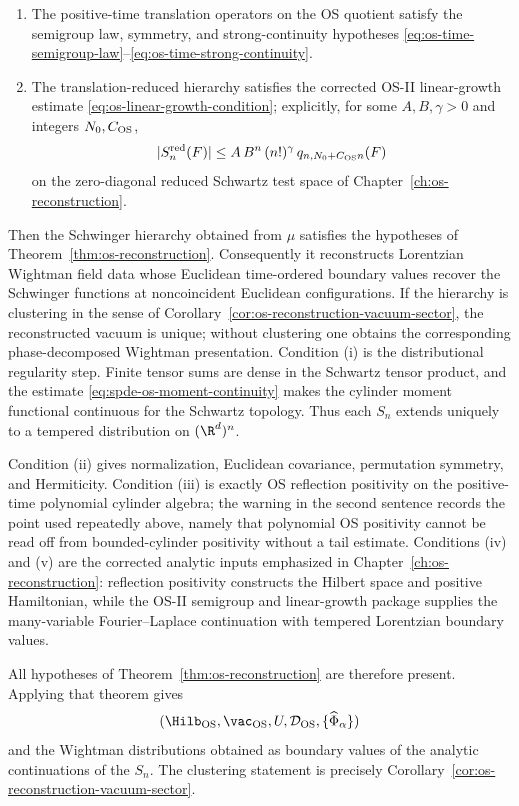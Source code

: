 \begin{remark}
\begin{enumerate}[label=(\roman*)]
  integrability or truncation estimates appropriate to the cutoff limit.
  \item The positive-time translation operators on the OS quotient satisfy
  the semigroup law, symmetry, and strong-continuity hypotheses
  \eqref{eq:os-time-semigroup-law}--\eqref{eq:os-time-strong-continuity}.
  \item The translation-reduced hierarchy satisfies the corrected OS-II
  linear-growth estimate \eqref{eq:os-linear-growth-condition};
  explicitly, for some \(A,B,\gamma>0\) and integers \(N_0,C_{\rm OS}\),
  \[
    |S_n^{\rm red}(F)|
    \leq
    A\,B^n\,(n!)^\gamma\,
    q_{n,N_0+C_{\rm OS}n}(F)
  \]
  on the zero-diagonal reduced Schwartz test space of
  Chapter~\ref{ch:os-reconstruction}.
\end{enumerate}
Then the Schwinger hierarchy obtained from \(\mu\) satisfies the hypotheses
of Theorem~\ref{thm:os-reconstruction}.  Consequently it reconstructs
Lorentzian Wightman field data whose Euclidean time-ordered boundary values
recover the Schwinger functions at noncoincident Euclidean configurations.
If the hierarchy is clustering in the sense of
Corollary~\ref{cor:os-reconstruction-vacuum-sector}, the reconstructed vacuum is
unique; without clustering one obtains the corresponding phase-decomposed
Wightman presentation.
Condition (i) is the distributional regularity step.  Finite tensor sums are
dense in the Schwartz tensor product, and the estimate
\eqref{eq:spde-os-moment-continuity} makes the cylinder moment functional
continuous for the Schwartz topology.  Thus each \(S_n\) extends uniquely to
a tempered distribution on \((\R^d)^n\).

Condition (ii) gives normalization, Euclidean covariance, permutation
symmetry, and Hermiticity.  Condition (iii) is exactly OS reflection
positivity on the positive-time polynomial cylinder algebra; the warning in
the second sentence records the point used repeatedly above, namely that
polynomial OS positivity cannot be read off from bounded-cylinder positivity
without a tail estimate.  Conditions (iv) and (v) are the corrected analytic
inputs emphasized in Chapter~\ref{ch:os-reconstruction}: reflection
positivity constructs the Hilbert space and positive Hamiltonian, while the
OS-II semigroup and linear-growth package supplies the many-variable
Fourier--Laplace continuation with tempered Lorentzian boundary values.

All hypotheses of Theorem~\ref{thm:os-reconstruction} are therefore present.
Applying that theorem gives
\[
  (\Hilb_{\rm OS},\vac_{\rm OS},U,\mathcal D_{\rm OS},
  \{\widehat\Phi_\alpha\})
\]
and the Wightman distributions obtained as boundary values of the analytic
continuations of the \(S_n\).  The clustering statement is precisely
Corollary~\ref{cor:os-reconstruction-vacuum-sector}.
\end{remark}

